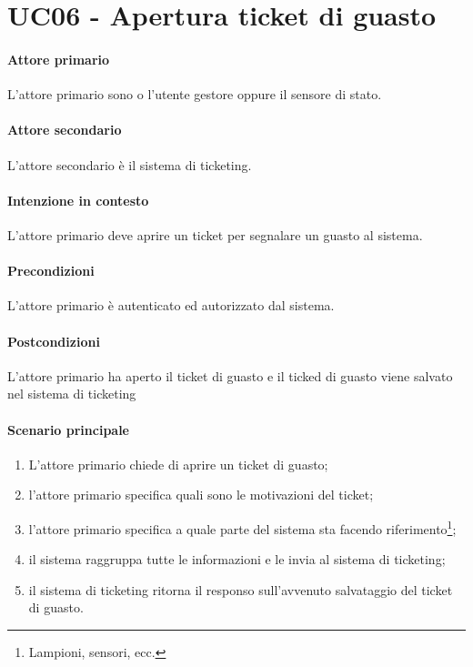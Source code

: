 \section{UC06 - Apertura ticket di guasto}

\paragraph{Attore primario} L'attore primario sono o l'utente gestore oppure il sensore di stato.

\paragraph{Attore secondario} L'attore secondario è il sistema di ticketing.

\paragraph{Intenzione in contesto} L'attore primario deve aprire un ticket per segnalare un guasto al sistema.

\paragraph{Precondizioni} L'attore primario è autenticato ed autorizzato dal sistema.

\paragraph{Postcondizioni} L'attore primario ha aperto il ticket di guasto e il ticked di guasto viene salvato nel sistema di ticketing

\paragraph{Scenario principale}

\begin{enumerate}
    \item L'attore primario chiede di aprire un ticket di guasto;
    \item l'attore primario specifica quali sono le motivazioni del ticket;
    \item l'attore primario specifica a quale parte del sistema sta facendo riferimento\footnote{Lampioni, sensori, ecc.};
    \item il sistema raggruppa tutte le informazioni e le invia al sistema di ticketing;
    \item il sistema di ticketing ritorna il responso sull'avvenuto salvataggio del ticket di guasto.
\end{enumerate}
